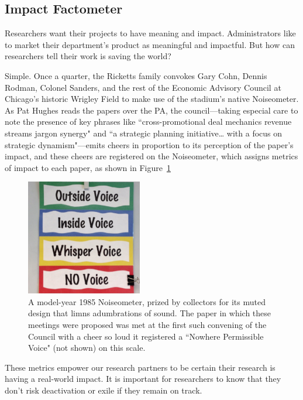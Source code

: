 \subsection{Impact Factometer}

Researchers want their projects to have meaning and impact. Administrators like to market their department's product as meaningful and impactful. But how can researchers tell their work is saving the world?

Simple. Once a quarter, the Ricketts family convokes Gary Cohn, Dennis Rodman,
Colonel Sanders, and the rest of the Economic Advisory Council at Chicago's
historic Wrigley Field to make use of the stadium's native Noiseometer. As Pat
Hughes reads the papers over the PA, the council---taking especial care to
note the presence of key phrases like ``cross-promotional deal mechanics
revenue streams jargon synergy" and ``a strategic planning initiative\ldots
with a focus on strategic dynamism"---emits cheers in proportion to its
perception of the paper's impact, and these cheers are registered on the
Noiseometer, which assigns metrics of impact to each paper, as shown in Figure~\ref{fig:noiseometer}


\begin{figure}
  \centering
  \includegraphics[width=0.45\textwidth]{figures/noiseometer.jpeg}
  \caption{A model-year 1985 Noiseometer, prized by collectors for its muted
  design that limns adumbrations of sound. The paper in which these meetings
were proposed was met at the first such convening of the Council with a cheer
so loud it registered a ``Nowhere Permissible Voice"  (not shown) on this scale.}
  \label{fig:noiseometer}
\end{figure}


These metrics empower our research partners to be certain their research is having a real-world impact.  It is important for researchers to know that they don't risk deactivation or exile if they remain on track.
